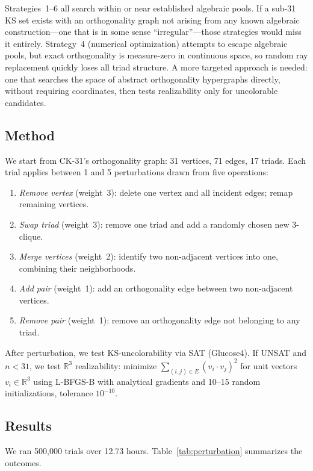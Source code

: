 \documentclass[twocolumn,pra,superscriptaddress,nofootinbib]{revtex4-2}
\newcommand{\R}{\mathbb{R}}
\begin{document}
Strategies~1--6 all search within or near established algebraic pools. If a sub-31 KS set exists with an orthogonality graph not arising from any known algebraic construction---one that is in some sense ``irregular''---those strategies would miss it entirely. Strategy~4 (numerical optimization) attempts to escape algebraic pools, but exact orthogonality is measure-zero in continuous space, so random ray replacement quickly loses all triad structure. A more targeted approach is needed: one that searches the space of abstract orthogonality hypergraphs directly, without requiring coordinates, then tests realizability only for uncolorable candidates.

\subsection{Method}

We start from CK-31's orthogonality graph: 31 vertices, 71 edges, 17 triads. Each trial applies between 1 and 5 perturbations drawn from five operations:
\begin{enumerate}
\item \emph{Remove vertex} (weight~3): delete one vertex and all incident edges; remap remaining vertices.
\item \emph{Swap triad} (weight~3): remove one triad and add a randomly chosen new 3-clique.
\item \emph{Merge vertices} (weight~2): identify two non-adjacent vertices into one, combining their neighborhoods.
\item \emph{Add pair} (weight~1): add an orthogonality edge between two non-adjacent vertices.
\item \emph{Remove pair} (weight~1): remove an orthogonality edge not belonging to any triad.
\end{enumerate}

After perturbation, we test KS-uncolorability via SAT (Glucose4). If UNSAT and $n < 31$, we test $\R^3$ realizability: minimize $\sum_{(i,j)\in E}(v_i\cdot v_j)^2$ for unit vectors $v_i \in \R^3$ using L-BFGS-B with analytical gradients and 10--15 random initializations, tolerance $10^{-10}$.

\subsection{Results}

We ran 500,000 trials over 12.73 hours. Table~\ref{tab:perturbation} summarizes the outcomes.
\end{document}
